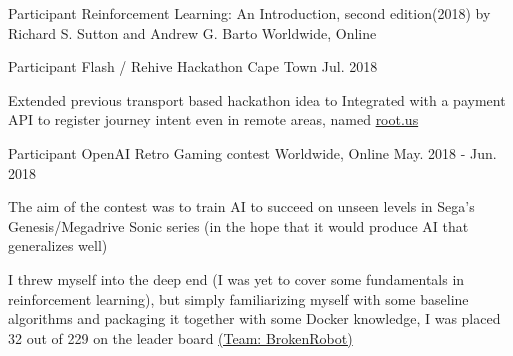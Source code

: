 

\begin{cventries}

  \cventry
    {Participant} %
    {Reinforcement Learning: An Introduction, second edition(2018) by Richard S. Sutton and Andrew G. Barto} %
    {Worldwide, Online} %
    {} %
    {
      \begin{cvitems} %
        \item {}
        \item {}
      \end{cvitems}
    }

  \cventry
    {Participant} %
    {Flash / Rehive Hackathon} %
    {Cape Town} %
    {Jul. 2018 } %
    {
      \begin{cvitems} %
        \item {Extended previous transport based hackathon idea to Integrated with a payment API to register journey intent even in remote areas, named \href{https://github.com/dnk8n/root.us}{root.us}}
      \end{cvitems}
    }

  \cventry
    {Participant} %
    {OpenAI Retro Gaming contest} %
    {Worldwide, Online} %
    {May. 2018 - Jun. 2018} %
    {
      \begin{cvitems} %
        \item {The aim of the contest was to train AI to succeed on unseen levels in Sega’s Genesis/Megadrive Sonic series (in the hope that it would produce AI that generalizes well)}
        \item {I threw myself into the deep end (I was yet to cover some fundamentals in reinforcement learning), but simply familiarizing myself with some baseline algorithms and packaging it together with some Docker knowledge, I was placed 32 out of 229 on the leader board {\href{https://contest.openai.com/2018-1/users/314}{(Team: BrokenRobot)}}}
      \end{cvitems}
    }


\end{cventries}
